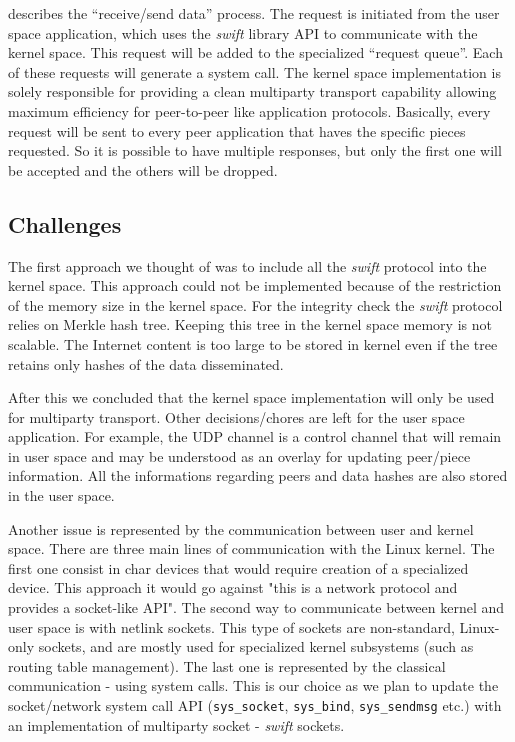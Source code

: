 
 describes the “receive/send data” process. The request is initiated from the user space
application, which uses the \emph{swift} library API to communicate with the kernel space. This request will be added to
the
specialized “request queue”. Each of these requests will generate a system call. The kernel space implementation is
solely responsible for providing a clean multiparty transport capability allowing maximum efficiency for peer-to-peer
like application protocols. Basically, every request will be sent to every peer application that haves the specific
pieces requested. So it is possible to have multiple responses, but only the first one will be accepted and the others
will be dropped. 

\subsection{Challenges}

The first approach we thought of was to include all the \emph{swift} protocol into the kernel space. This approach could
not be implemented because of the restriction of the memory size in the kernel space. For the integrity check the
\emph{swift} protocol relies on Merkle hash tree. Keeping this tree in the kernel space memory is not scalable. The
Internet content is too large to be stored in kernel even if the tree retains only hashes of the data disseminated.

After this we concluded that the kernel space implementation will only be used for multiparty transport. Other
decisions/chores are left for the user space application. For example, the UDP channel is a control channel that will
remain in user space and may be understood as an overlay for updating peer/piece information. All the informations
regarding peers and data hashes are also stored in the user space.

Another issue is represented by the communication between user and kernel space. There are three main lines of
communication with the Linux kernel. The first one consist in char devices that would require creation of a specialized
device. This approach it would go against "this is a network protocol and provides a socket-like API". The second way to
communicate between kernel and user space is with netlink sockets. This type of sockets are non-standard, Linux-only
sockets, and are mostly used for specialized kernel subsystems (such as routing table management). The last one is
represented by the classical communication - using system calls. This is our choice as we plan to update the
socket/network system call API (\texttt{sys\_socket}, \texttt{sys\_bind}, \texttt{sys\_sendmsg} etc.) with an
implementation of multiparty socket - \emph{swift} sockets.

